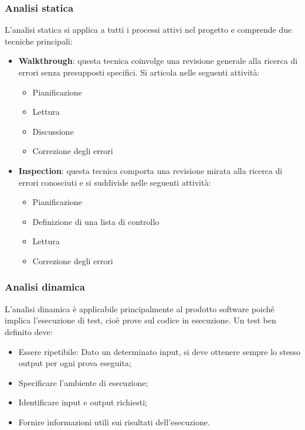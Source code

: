 \subsubsection{Analisi statica}
L'analisi statica si applica a tutti i processi attivi nel progetto e comprende due tecniche principali:
\begin{itemize}
    \item \textbf{Walkthrough}: questa tecnica coinvolge una revisione generale alla ricerca di errori
    senza presupposti specifici. Si articola nelle seguenti attività:
    \begin{itemize}
        \item Pianificazione
        \item Lettura
        \item Discussione
        \item Correzione degli errori
    \end{itemize}
    \item \textbf{Inspection}: questa tecnica comporta una revisione mirata alla ricerca di errori conosciuti
    e si suddivide nelle seguenti attività:
    \begin{itemize}
        \item Pianificazione
        \item Definizione di una lista di controllo
        \item Lettura
        \item Correzione degli errori
    \end{itemize}
\end{itemize}
\subsubsection{Analisi dinamica}
L'analisi dinamica è applicabile principalmente al prodotto software
poiché implica l'esecuzione di test, cioè prove sul codice in esecuzione.
Un test ben definito deve:
\begin{itemize}
    \item Essere ripetibile: Dato un determinato input, si deve ottenere sempre
    lo stesso output per ogni prova eseguita;
    \item Specificare l'ambiente di esecuzione;
    \item Identificare input e output richiesti;
    \item Fornire informazioni utili sui risultati dell'esecuzione.
\end{itemize}

